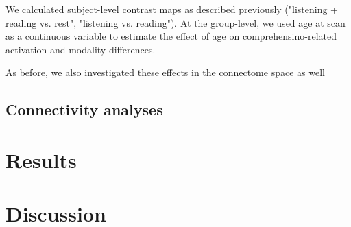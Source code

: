 We calculated subject-level contrast maps as described previously ("listening + reading vs. rest", "listening vs. reading"). At the group-level, we used age at scan as a continuous variable to estimate the effect of age on comprehensino-related activation and modality differences.

As before, we also investigated these effects in the connectome space as well 


\subsection{Connectivity analyses}


\section{Results}

\begin{figure}[t]
	\centering
    \caption[Relationship between activation in visual word form area and age.]{}
\end{figure}


\begin{figure}[t]
	\centering
    \caption[Global participation coefficient as a function of age.]{}
\end{figure}


\begin{figure}[t]
	\centering
    \caption[Similarity between reading and listening networks as a function of age.]{}
\end{figure}


\begin{figure}[t]
	\centering
    \caption[]{}
\end{figure}

\section{Discussion}


